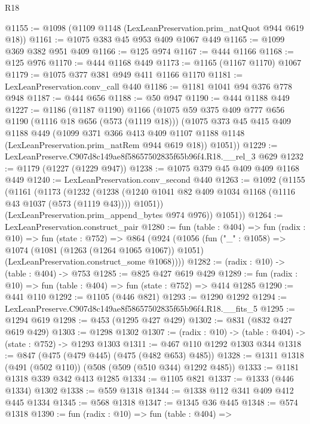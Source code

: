 \begin{lexlean}{R18}
\begin{coremodule}
@1155 := @1098 (@1109 @1148 (LexLeanPreservation.prim_natQuot @944 @619 @18))
@1161 := @1075 @383 @45 @953 @409 @1067 @449
@1165 := @1099 @369 @382 @951 @409
@1166 := @125 @974
@1167 := @444 @1166
@1168 := @125 @976
@1170 := @444 @1168 @449
@1173 := @1165 (@1167 @1170) @1067
@1179 := @1075 @377 @381 @949 @411 @1166 @1170
@1181 := LexLeanPreservation.conv_call @440
@1186 := @1181 @1041 @94 @376 @778 @948
@1187 := @444 @656
@1188 := @50 @947
@1190 := @444 @1188 @449
@1227 := @1186
    (@1187 @1190)
    @1166
    (@1075
      @59
      @375
      @409
      @777
      @656
      @1190
      (@1116 @18 @656 (@573 (@1119 @18)))
      (@1075
        @373
        @45
        @415
        @409
        @1188
        @449
        (@1099
          @371
          @366
          @413
          @409
          @1107
          @1188
          @1148
          (LexLeanPreservation.prim_natRem @944 @619 @18))
        @1051))
@1229 := LexLeanPreserve.C907d8c149ae8f58657502835f65b96f4.R18.__rel_3 @629
@1232 := @1179 (@1227 (@1229 @947))
@1238 := @1075 @379 @45 @409 @409 @1168 @449
@1240 := LexLeanPreservation.conv_second @440
@1263 := @1092
    (@1155
      (@1161
        (@1173
          (@1232
            (@1238 (@1240 @1041 @82 @409 @1034 @1168 (@1116 @43 @1037 (@573 (@1119 @43)))) @1051))
          (LexLeanPreservation.prim_append_bytes @974 @976))
        @1051))
@1264 := LexLeanPreservation.construct_pair
@1280 := fun (table : @404) =>
  fun (radix : @10) =>
  fun (state : @752) =>
  @864
    (@924
      (@1056
        (fun ("_" : @1058) =>
        @1074
          (@1081 (@1263 (@1264 @1065 @1067)) @1051)
          (LexLeanPreservation.construct_some @1068))))
@1282 := (radix : @10) -> (table : @404) -> @753
@1285 := @825 @427 @619 @429
@1289 := fun (radix : @10) => fun (table : @404) => fun (state : @752) => @414 @1285
@1290 := @441 @110
@1292 := @1105 (@446 @821)
@1293 := @1290 @1292
@1294 := LexLeanPreserve.C907d8c149ae8f58657502835f65b96f4.R18.__fits_5
@1295 := @1294 @619
@1298 := @453 (@1295 @427 @429)
@1302 := @831 (@832 @427 @619 @429)
@1303 := @1298 @1302
@1307 := (radix : @10) -> (table : @404) -> (state : @752) -> @1293 @1303
@1311 := @467 @110 @1292 @1303 @344
@1318 := @847 (@475 (@479 @445) (@475 (@482 @653) @485))
@1328 := @1311 @1318 (@491 (@502 @110)) (@508 (@509 (@510 @344) @1292 @485))
@1333 := @1181 @1318 @339 @342 @413 @1285
@1334 := @1105 @821
@1337 := @1333 (@446 @1334) @1302
@1338 := @559 @1318
@1344 := @1338 @112 @341 @409 @412 @445 @1334
@1345 := @568 @1318
@1347 := @1345 @36 @445
@1348 := @574 @1318
@1390 := fun (radix : @10) =>
  fun (table : @404) =>

\end{coremodule}
\end{lexlean}
